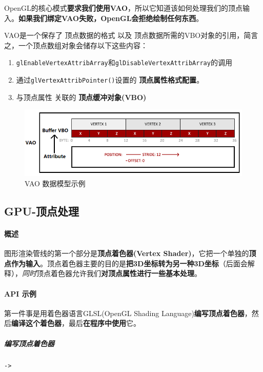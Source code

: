 \documentclass[UTF8,a4paper,12pt]{ctexbook}
\begin{document}
					OpenGL的核心模式\textbf{要求我们使用VAO}，所以它知道该如何处理我们的顶点输入。\textbf{如果我们绑定VAO失败，OpenGL会拒绝绘制任何东西}。
					
					VAO是一个保存了 顶点数据的格式 以及 顶点数据所需的VBO对象的引用，简言之，一个顶点数组对象会储存以下这些内容：
					\begin{enumerate}
						\item \verb|glEnableVertexAttribArray|和\verb|glDisableVertexAttribArray|的调用
						\item 通过\verb|glVertexAttribPointer()|设置的 \textbf{顶点属性格式配置}。
						\item 与顶点属性 关联的 \textbf{顶点缓冲对象(VBO)}
					\end{enumerate}
					
					
					\begin{figure}[H]
						\centering
						\includegraphics[width=\linewidth]{VBO_Attr}
						\caption{VAO 数据模型示例}
					\end{figure}
					
							
		\subsection{GPU-顶点处理}
			\paragraph{概述}		
				图形渲染管线的第一个部分是\textbf{顶点着色器(Vertex Shader)}，它把一个单独的\textbf{顶点作为输入}。顶点着色器主要的目的是\textbf{把3D坐标转为另一种3D坐标}（后面会解释），\textit{同时}顶点着色器允许我们\textbf{对顶点属性进行一些基本处理}。
			
			\paragraph{API 示例}
				第一件事是用着色器语言GLSL(OpenGL Shading Language)\textbf{编写顶点着色器}，然后\textbf{编译这个着色器}，最后\textbf{在程序中使用}它。
				
				\subparagraph{编写顶点着色器}\verb|->|
				
\end{document}

